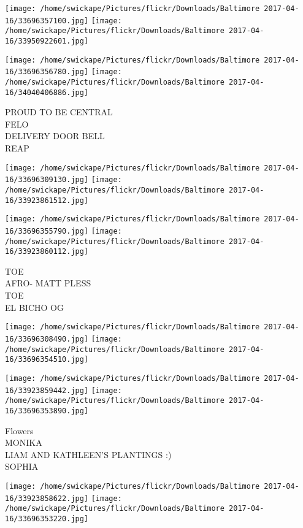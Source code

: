 \documentclass[10pt,letterpaper]{article}
\begin{document}
\texttt{[image: /home/swickape/Pictures/flickr/Downloads/Baltimore 2017-04-16/33696357100.jpg]}
\texttt{[image: /home/swickape/Pictures/flickr/Downloads/Baltimore 2017-04-16/33950922601.jpg]}

\texttt{[image: /home/swickape/Pictures/flickr/Downloads/Baltimore 2017-04-16/33696356780.jpg]}
\texttt{[image: /home/swickape/Pictures/flickr/Downloads/Baltimore 2017-04-16/34040406886.jpg]}

PROUD TO BE CENTRAL\\
FELO\\
DELIVERY DOOR BELL\\
REAP\\
\pagebreak

\texttt{[image: /home/swickape/Pictures/flickr/Downloads/Baltimore 2017-04-16/33696309130.jpg]}
\texttt{[image: /home/swickape/Pictures/flickr/Downloads/Baltimore 2017-04-16/33923861512.jpg]}

\texttt{[image: /home/swickape/Pictures/flickr/Downloads/Baltimore 2017-04-16/33696355790.jpg]}
\texttt{[image: /home/swickape/Pictures/flickr/Downloads/Baltimore 2017-04-16/33923860112.jpg]}

TOE\\
AFRO{-} MATT PLESS\\
TOE\\
EL BICHO OG\\
\pagebreak

\texttt{[image: /home/swickape/Pictures/flickr/Downloads/Baltimore 2017-04-16/33696308490.jpg]}
\texttt{[image: /home/swickape/Pictures/flickr/Downloads/Baltimore 2017-04-16/33696354510.jpg]}

\texttt{[image: /home/swickape/Pictures/flickr/Downloads/Baltimore 2017-04-16/33923859442.jpg]}
\texttt{[image: /home/swickape/Pictures/flickr/Downloads/Baltimore 2017-04-16/33696353890.jpg]}

Flowers\\
MONIKA\\
LIAM AND KATHLEEN'S PLANTINGS :)\\
SOPHIA\\
\pagebreak

\texttt{[image: /home/swickape/Pictures/flickr/Downloads/Baltimore 2017-04-16/33923858622.jpg]}
\texttt{[image: /home/swickape/Pictures/flickr/Downloads/Baltimore 2017-04-16/33696353220.jpg]}
\end{document}
